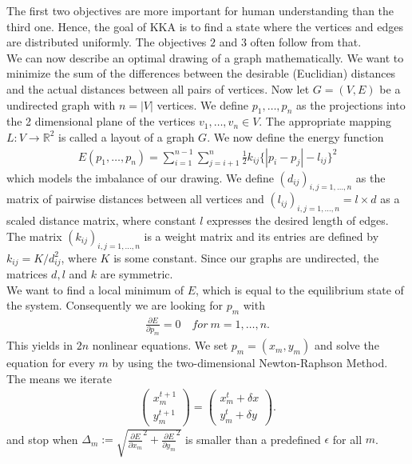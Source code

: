 \documentclass[12pt,a4paper]{article}
\begin{document}
The first two objectives are more important for human understanding than the third one. Hence, the goal of KKA is to find a state where the vertices and edges are distributed uniformly. The objectives $2$ and $3$ often follow from that. \\
We can now describe an optimal drawing of a graph mathematically. We want to minimize the sum of the differences between the desirable (Euclidian) distances and the actual distances between all pairs of vertices. Now let $G = (V,E)$ be a undirected graph with $n = |V|$ vertices. We define $ p_1 , \dots, p_n$ as the projections into the 2 dimensional plane of the vertices $v_1, \dots , v_n \in V$. The appropriate mapping $L:V\rightarrow\mathbb{R}^2$ is called a layout of a graph $G$. We now define the energy function
\begin{align}
\label{energyf}
E(p_1 , \dots, p_n) = \sum_{i=1}^{n-1} \sum_{j=i+1}^n \frac{1}{2} k_{ij} \lbrace | p_i - p_j | - l_{ij} \rbrace^2
\end{align}
which models the imbalance of our drawing. We define $(d_{ij})_{i,j = 1, \dots,n}$ as the matrix of pairwise distances between all vertices and $(l_{ij})_{i,j = 1, \dots,n} = l \times d $ as a scaled distance matrix, where constant $l$ expresses the desired length of edges. The matrix $(k_{ij})_{i,j = 1, \dots,n}$ is a weight matrix and its entries are defined by $k_{ij} = K / d_{ij}^2$, where $K$ is some constant. Since our graphs are undirected, the matrices $d, l$ and $k$ are symmetric. \\ 
We want to find a local minimum of $E$, which is equal to the equilibrium state of the system. Consequently we are looking for $p_m$ with 
\begin{align*}
\frac{\partial E}{\partial p_m} = 0 \quad for \ m=1, \dots,n.
\end{align*}
This yields in $2n$ nonlinear equations. We set $p_m = (x_m, y_m)$ and solve the equation for every $m$ by using the two-dimensional Newton-Raphson Method. The means we iterate
\begin{align*}
\begin{pmatrix}
x_m^{t+1} \\
y_m^{t+1}
\end{pmatrix}
=
\begin{pmatrix}
x_m^t + \delta x \\
y_m^t + \delta y
\end{pmatrix}.
\end{align*}
and stop when $\Delta_m := \sqrt{\frac{\partial E}{\partial x_m}^2 + \frac{\partial E}{\partial y_m}^2}$ is smaller than a predefined $ \epsilon$ for all $m$. 
\end{document}
